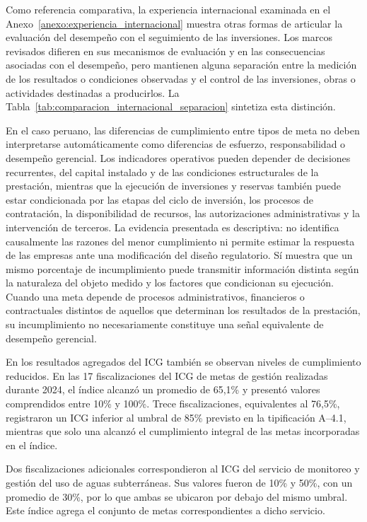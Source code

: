 Como referencia comparativa, la experiencia internacional examinada en el Anexo~\ref{anexo:experiencia_internacional} muestra otras formas de articular la evaluación del desempeño con el seguimiento de las inversiones. Los marcos revisados difieren en sus mecanismos de evaluación y en las consecuencias asociadas con el desempeño, pero mantienen alguna separación entre la medición de los resultados o condiciones observadas y el control de las inversiones, obras o actividades destinadas a producirlos. La Tabla~\ref{tab:comparacion_internacional_separacion} sintetiza esta distinción.


En el caso peruano, las diferencias de cumplimiento entre tipos de meta no deben interpretarse automáticamente como diferencias de esfuerzo, responsabilidad o desempeño gerencial. Los indicadores operativos pueden depender de decisiones recurrentes, del capital instalado y de las condiciones estructurales de la prestación, mientras que la ejecución de inversiones y reservas también puede estar condicionada por las etapas del ciclo de inversión, los procesos de contratación, la disponibilidad de recursos, las autorizaciones administrativas y la intervención de terceros. La evidencia presentada es descriptiva: no identifica causalmente las razones del menor cumplimiento ni permite estimar la respuesta de las empresas ante una modificación del diseño regulatorio. Sí muestra que un mismo porcentaje de incumplimiento puede transmitir información distinta según la naturaleza del objeto medido y los factores que condicionan su ejecución. Cuando una meta depende de procesos administrativos, financieros o contractuales distintos de aquellos que determinan los resultados de la prestación, su incumplimiento no necesariamente constituye una señal equivalente de desempeño gerencial.

En los resultados agregados del ICG también se observan niveles de cumplimiento reducidos. En las 17 fiscalizaciones del ICG de metas de gestión realizadas durante 2024, el índice alcanzó un promedio de 65,1\% y presentó valores comprendidos entre 10\% y 100\%. Trece fiscalizaciones, equivalentes al 76,5\%, registraron un ICG inferior al umbral de 85\% previsto en la tipificación A--4.1, mientras que solo una alcanzó el cumplimiento integral de las metas incorporadas en el índice.

Dos fiscalizaciones adicionales correspondieron al ICG del servicio de monitoreo y gestión del uso de aguas subterráneas. Sus valores fueron de 10\% y 50\%, con un promedio de 30\%, por lo que ambas se ubicaron por debajo del mismo umbral. Este índice agrega el conjunto de metas correspondientes a dicho servicio.

